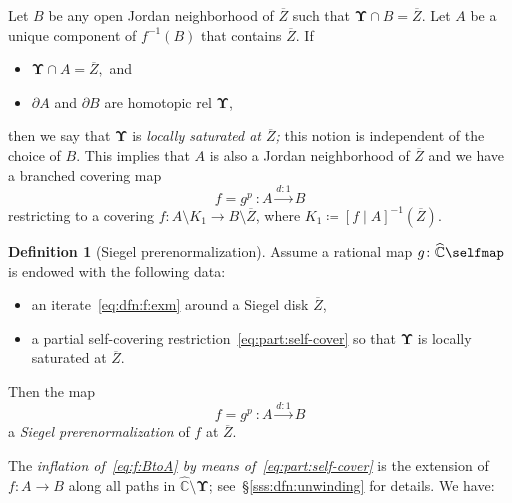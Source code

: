 \documentclass{amsart}
\newcommand{\1}{{\mathbb 1 }}
\newcommand{\bUpsilon}{{\mathbf \Upsilon}}
\newcommand{\wC}{\widehat{\mathbb{C}}}
\theoremstyle{remark}
\numberwithin{equation}{section}
\theoremstyle{definition}
\newtheorem{defn}[thm]{Definition}
\begin{document}
Let $B$ be any open Jordan neighborhood of $\overline{Z}$ such that $\bUpsilon \cap B=\overline Z$. Let $A$ be a unique component of $f^{-1}(B)$ that contains $\overline Z$. 
If 
\begin{itemize}
    \item $\bUpsilon \cap A= \overline Z,$ and
    \item $\partial A$ and $\partial B$ are homotopic rel $\bUpsilon$,
\end{itemize}
then we say that $\bUpsilon$ is \emph{locally saturated at $\overline Z$;} this notion is independent of the choice of $B$. This implies that $A$ is also a Jordan neighborhood of $\overline Z$ and we have a branched covering map
\begin{equation}
\label{eq:f:BtoA:pre} f=g^p\ \colon A\overset{d:1}\longrightarrow B
\end{equation} restricting to a covering $f\colon A\setminus K_1\to B\setminus \overline Z$, where $K_1\coloneqq [f\mid A]^{-1}(\overline Z)$.  


\begin{defn}[Siegel prerenormalization]\label{dfn:SiegelPreNorm} Assume a rational map $g\colon \wC\selfmap$ is endowed with  the following data:
\begin{itemize}
\item an iterate~\eqref{eq:dfn:f:exm} around a Siegel disk $\overline Z$,
\item a partial self-covering restriction~\eqref{eq:part:self-cover} so that $\bUpsilon$ is locally saturated at $\overline Z$.
\end{itemize} 
Then the map
\begin{equation}
\label{eq:f:BtoA} f=g^p\ \colon A\overset{d:1}\longrightarrow B
\end{equation} a \emph{Siegel prerenormalization} of $f$ at $\overline Z$.
\end{defn}



The \emph{inflation of~\eqref{eq:f:BtoA} by means of~\eqref{eq:part:self-cover}} is the extension of $f\colon A\to B$ along all paths in $\wC\setminus \bUpsilon$; see~\S\ref{sss:dfn:unwinding} for details.  We have:
\end{document}
